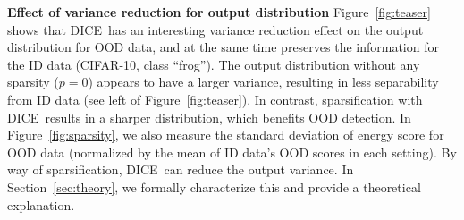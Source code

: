 \documentclass[runningheads]{llncs}
\newcommand{\methodAbbr}{DICE~}
\begin{document}
\noindent \textbf{Effect of variance reduction for output distribution} 
Figure~\ref{fig:teaser} shows that \methodAbbr has an interesting variance reduction effect on the output distribution for OOD data, and at the same time preserves the information for the ID data (CIFAR-10, class ``frog''). The output distribution without any sparsity ($p=0$) appears to have a larger variance, resulting in less separability from ID data (see left of Figure~\ref{fig:teaser}). In contrast, sparsification with \methodAbbr results in a sharper distribution, which benefits OOD detection. 
In Figure~\ref{fig:sparsity}, we also measure the standard deviation of energy score for OOD data (normalized by the mean of ID data's OOD scores in each setting). By way of sparsification, \methodAbbr can reduce the output variance. In Section~\ref{sec:theory}, we formally characterize this and provide a theoretical explanation. 




\begin{table}[t]
\caption{\small \textbf{Ablation results.} Effect of different \textit{post hoc} sparsification methods for OOD detection with ImageNet as ID dataset. All sparsification methods are based on the {same OOD scoring function}~\cite{liu2020energy}, with sparsity parameter $p=0.7$. All values are percentages and are averaged over multiple OOD test datasets.}
\label{tab:prune-results}
\centering
{}
\end{table}
\end{document}
